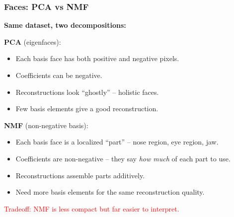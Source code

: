 \documentclass[notes,11pt, aspectratio=169]{beamer}
\begin{document}
\begin{frame}
\frametitle{Faces: PCA vs NMF}

\textbf{Same dataset, two decompositions:}

\vspace{4pt}
\textbf{PCA} (eigenfaces):
\begin{itemize}
    \item Each basis face has both positive and negative pixels.
    \item Coefficients can be negative.
    \item Reconstructions look ``ghostly'' -- holistic faces.
    \item Few basis elements give a good reconstruction.
\end{itemize}

\vspace{6pt}
\textbf{NMF} (non-negative basis):
\begin{itemize}
    \item Each basis face is a localized ``part'' -- nose region, eye region, jaw.
    \item Coefficients are non-negative -- they say \emph{how much} of each part to use.
    \item Reconstructions assemble parts additively.
    \item Need more basis elements for the same reconstruction quality.
\end{itemize}

\vspace{6pt}
\textcolor{red}{Tradeoff: NMF is less compact but far easier to interpret.}
\end{frame}
\end{document}

